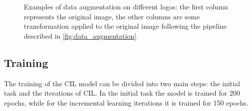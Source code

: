 \begin{figure}[H]
	\centering
	\hfill
	\hfill
	\hfill
	\hfill
	\hfill
	\caption{Examples of data augmentation on different logos: the first column represents the original image, the other columns are some transformation applied to the original image following the pipeline described in \autoref{fig:data_augmentation}.}%
	\label{fig:final_data_augmentation}%
\end{figure}

\subsection{Training}
The training of the CIL model can be divided into two main steps: the initial task and the iterations of CIL. In the initial task the model is trained for 200 epochs, while for the incremental learning iterations it is trained for 150 epochs.

